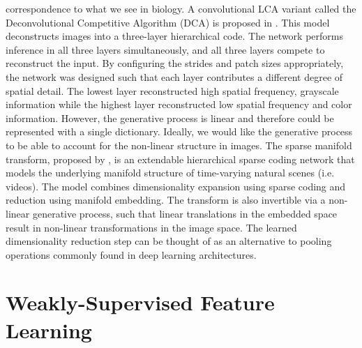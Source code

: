 correspondence to what we see in biology. A convolutional LCA variant called the Deconvolutional Competitive Algorithm (DCA) is proposed in \parencite{paiton2015deconvolutional}. This model deconstructs images into a three-layer hierarchical code. The network performs inference in all three layers simultaneously, and all three layers compete to reconstruct the input. By configuring the strides and patch sizes appropriately, the network was designed such that each layer contributes a different degree of spatial detail. The lowest layer reconstructed high spatial frequency, grayscale information while the highest layer reconstructed low spatial frequency and color information. However, the generative process is linear and therefore could be represented with a single dictionary. Ideally, we would like the generative process to be able to account for the non-linear structure in images. The sparse manifold transform, proposed by \parencite{chen2018sparse}, is an extendable hierarchical sparse coding network that models the underlying manifold structure of time-varying natural scenes (i.e. videos). The model combines dimensionality expansion using sparse coding and reduction using manifold embedding. The transform is also invertible via a non-linear generative process, such that linear translations in the embedded space result in non-linear transformations in the image space. The learned dimensionality reduction step can be thought of as an alternative to pooling operations commonly found in deep learning architectures.



\section{Weakly-Supervised Feature Learning}\label{sec:ch3_weak_supervised_learning}

